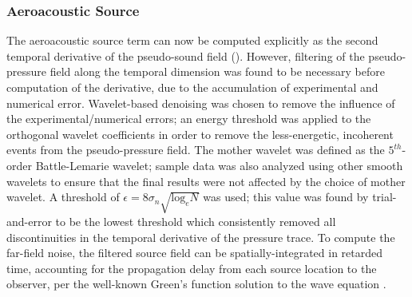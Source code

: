 \subsubsection{Aeroacoustic Source}
The aeroacoustic source term can now be computed explicitly as the second temporal derivative of the pseudo-sound field ().
However, filtering of the pseudo-pressure field along the temporal dimension was found to be necessary before computation of the derivative, due to the accumulation of experimental and numerical error.
Wavelet-based denoising was chosen to remove the influence of the experimental/numerical errors; an energy threshold was applied to the orthogonal wavelet coefficients in order to remove the less-energetic, incoherent events from the pseudo-pressure field.
The mother wavelet was defined as the $5^{th}$-order Battle-Lemarie wavelet; sample data was also analyzed using other smooth wavelets to ensure that the final results were not affected by the choice of mother wavelet.
A threshold of $\epsilon = 8 \sigma_n \sqrt{ \mathrm{log}_e N}$ was used; this value was found by trial-and-error to be the lowest threshold which consistently removed all discontinuities in the temporal derivative of the pressure trace.
To compute the far-field noise, the filtered source field can be spatially-integrated in retarded time, accounting for the propagation delay from each source location to the observer, per the well-known Green's function solution to the wave equation \citep{Crighton1992}. 

